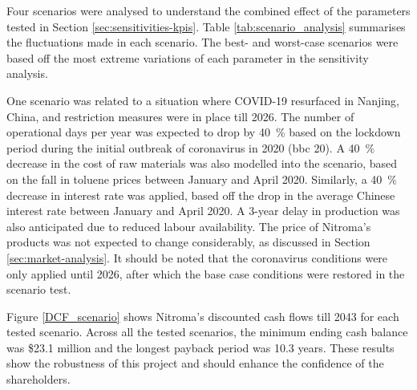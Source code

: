 Four scenarios were analysed to understand the combined effect of the parameters tested in Section \ref{sec:sensitivities-kpis}. Table \ref{tab:scenario_analysis} summarises the fluctuations made in each scenario. The best- and worst-case scenarios were based off the most extreme variations of each parameter in the sensitivity analysis. 

One scenario was related to a situation where COVID-19 resurfaced in Nanjing, China, and restriction measures were in place till 2026. The number of operational days per year was expected to drop by \SI{40}{\percent} based on the lockdown period during the initial outbreak of coronavirus in 2020 (bbc 20). A \SI{40}{\percent} decrease in the cost of raw materials was also modelled into the scenario, based on the fall in toluene prices between January and April 2020. Similarly, a \SI{40}{\percent} decrease in interest rate was applied, based off the drop in the average Chinese interest rate between January and April 2020. A 3-year delay in production was also anticipated due to reduced labour availability. The price of Nitroma’s products was not expected to change considerably, as discussed in Section \ref{sec:market-analysis}. It should be noted that the coronavirus conditions were only applied until 2026, after which the base case conditions were restored in the scenario test.

Figure \ref{DCF_scenario} shows Nitroma’s discounted cash flows till 2043 for each tested scenario. Across all the tested scenarios, the minimum ending cash balance was \$23.1 million and the longest payback period was 10.3 years. These results show the robustness of this project and should enhance the confidence of the shareholders.

